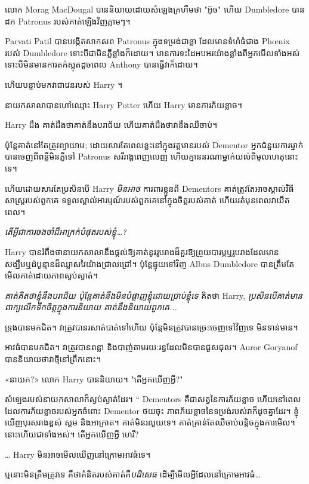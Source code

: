 \later

លោក Morag MacDougal បាននិយាយដោយសំឡេងគ្រហឹមថា "អ៊ូច" ហើយ Dumbledore បានដក Patronus របស់គាត់ឡើងវិញភ្លាមៗ។

Parvati Patil បានបង្កើតសាកសព Patronus ក្នុងទម្រង់ជាខ្លា ដែលមានទំហំធំជាង Phœnix របស់ Dumbledore ទោះបីជាមិនភ្លឺខ្លាំងក៏ដោយ។ មាន​ការ​ទះ​ដៃ​អបអរ​យ៉ាង​ខ្លាំង​ពី​អ្នក​មើល​ទាំង​អស់ ទោះ​បី​មិន​មាន​ការ​តក់ស្លុត​ដូច​ពេល Anthony បាន​ធ្វើ​វា​ក៏​ដោយ។

ហើយបន្ទាប់មកវាជាវេនរបស់ Harry ។

នាយកសាលាបានហៅឈ្មោះ Harry Potter ហើយ Harry មានការភ័យខ្លាច។

Harry ដឹង គាត់ដឹងថាគាត់នឹងបរាជ័យ ហើយគាត់ដឹងថាវានឹងឈឺចាប់។

ប៉ុន្តែគាត់នៅតែត្រូវព្យាយាម; ដោយសារតែពេលខ្លះនៅក្នុងវត្តមានរបស់ Dementor អ្នកជំនួយការម្នាក់បានចេញពីពន្លឺមិនភ្លឺទៅ Patronus សរីរាង្គពេញលេញ ហើយគ្មាននរណាម្នាក់យល់ពីមូលហេតុនោះទេ។

ហើយដោយសារតែប្រសិនបើ Harry \emph{មិនអាច} ការពារខ្លួនពី Dementors គាត់ត្រូវតែអាចស្គាល់វិធីសាស្រ្តរបស់ពួកគេ ទទួលស្គាល់អារម្មណ៍របស់ពួកគេនៅក្នុងចិត្តរបស់គាត់ ហើយរត់មុនពេលវាយឺតពេល។

\emph{តើអ្វីជាការចងចាំដ៏អាក្រក់បំផុតរបស់ខ្ញុំ…?}

Harry បានរំពឹងថានាយកសាលានឹងផ្តល់ឱ្យគាត់នូវរូបរាងដ៏គួរឱ្យព្រួយបារម្ភឬរូបរាងដែលមានសង្ឃឹមឬដំបូន្មានដ៏ឈ្លាសវៃយ៉ាងជ្រាលជ្រៅ។ ប៉ុន្តែផ្ទុយទៅវិញ Albus Dumbledore បានត្រឹមតែមើលគាត់ដោយភាពស្ងប់ស្ងាត់។

\emph{គាត់គិតថាខ្ញុំនឹងបរាជ័យ ប៉ុន្តែគាត់នឹងមិនបំផ្លាញខ្ញុំដោយប្រាប់ខ្ញុំទេ} គិតថា Harry, \emph{ប្រសិនបើគាត់មានពាក្យលើកទឹកចិត្តក្នុងការនិយាយ គាត់នឹងនិយាយពួកគេ...}

ទ្រុងបានមកជិត។ វា​ត្រូវ​បាន​រសាត់​បាត់​ទៅ​ហើយ ប៉ុន្តែ​មិន​ត្រូវ​បាន​ច្រេះ​ចេញ​ទៅ​វិញ​ទេ មិន​ទាន់​មាន។

អាវធំបានមកជិត។ វាត្រូវបានពន្លា និងបាញ់តាមរយៈរន្ធដែលមិនបានជួសជុល។ Auror Goryanof បាននិយាយថាវាថ្មីនៅព្រឹកនោះ។

«នាយក?» លោក Harry បាននិយាយ។ "តើអ្នកឃើញអ្វី?"

សំឡេងរបស់នាយកសាលាក៏ស្ងប់ស្ងាត់ដែរ។ “ Dementors គឺជាសត្វនៃការភ័យខ្លាច ហើយនៅពេលដែលការភ័យខ្លាចរបស់អ្នកចំពោះ Dementor ថយចុះ ភាពភ័យខ្លាចនៃទម្រង់របស់វាក៏ដូចគ្នាដែរ។ ខ្ញុំ​ឃើញ​បុរស​រាង​ខ្ពស់ ស្គម និង​អាក្រាត។ គាត់មិនរលួយទេ។ គាត់គ្រាន់តែឈឺចាប់បន្តិចក្នុងការមើល។ នោះហើយជាទាំងអស់។ តើអ្នកឃើញអ្វី ហេរី?

… Harry មិនអាចមើលឃើញនៅក្រោមអាវធំទេ។

ឬនោះមិនត្រឹមត្រូវទេ គឺថាគំនិតរបស់គាត់គឺ\emph{បដិសេធ} ដើម្បីមើលអ្វីដែលនៅក្រោមអាវធំ…

